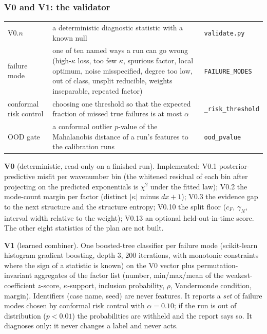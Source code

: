 \subsubsection{V0 and V1: the validator}\label{sec:valid}
\begin{symbols}
\begin{tabular}{@{}L{2.6cm}L{6.0cm}L{4.3cm}@{}}
V0.$n$ & a deterministic diagnostic statistic with a known null & \texttt{validate.py}\\
failure mode & one of ten named ways a run can go wrong (high-$\kappa$ loss, too few $\kappa$, spurious factor, local optimum, noise misspecified, degree too low, out of class, unsplit reducible, weights inseparable, repeated factor) & \texttt{FAILURE\_MODES}\\
conformal risk control & choosing one threshold so that the expected fraction of missed true failures is at most $\alpha$ & \texttt{\_risk\_threshold}\\
OOD gate & a conformal outlier $p$-value of the Mahalanobis distance of a run's features to the calibration runs & \texttt{ood\_pvalue}\\
\end{tabular}
\end{symbols}
\textbf{V0} (deterministic, read-only on a finished run). Implemented: V0.1 posterior-predictive misfit per wavenumber bin (the whitened residual of each bin after projecting on the predicted exponentials is $\chi^2$ under the fitted law); V0.2 the mode-count margin per factor (distinct $|\kappa|$ minus $dx+1$); V0.3 the evidence gap to the next structure and the structure entropy; V0.10 the split floor ($c_F$, $\gamma_N$, interval width relative to the weight); V0.13 an optional held-out-in-time score. The other eight statistics of the plan are not built.

\textbf{V1} (learned combiner). One boosted-tree classifier per failure mode (scikit-learn histogram gradient boosting, depth $3$, $200$ iterations, with monotonic constraints where the sign of a statistic is known) on the V0 vector plus permutation-invariant aggregates of the factor list (number, min/max/mean of the weakest-coefficient $z$-score, $\kappa$-support, inclusion probability, $\rho$, Vandermonde condition, margin). Identifiers (case name, seed) are never features. It reports a \emph{set} of failure modes chosen by conformal risk control with $\alpha=0.10$; if the run is out of distribution ($p<0.01$) the probabilities are withheld and the report says so. It diagnoses only: it never changes a label and never acts.

